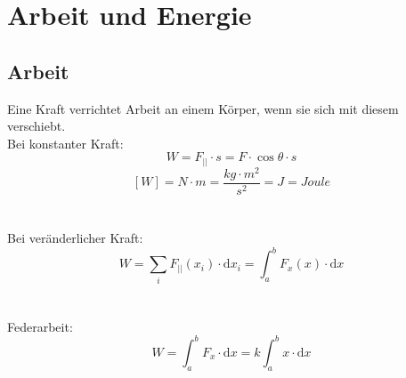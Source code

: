 



\chapter{Arbeit und Energie}
\section{Arbeit}
Eine Kraft verrichtet Arbeit an einem K\"orper, wenn sie sich mit diesem verschiebt.\\
\newline
Bei konstanter Kraft:
\[
	\boxed{W=F_{||}\cdot s=F\cdot\cos\theta\cdot s}
\]
\[
	[W]=N\cdot m=\frac{kg\cdot m^2}{s^2}=J=Joule
\]
\\
\\
Bei ver\"anderlicher Kraft:
\[
	\boxed{W=\sum_{i}{F_{||}(x_i)\cdot\mathrm{d}x_i}=\int_a^bF_x(x)\cdot\mathrm{d}x}
\]
\\
\\
Federarbeit:
\[
	\boxed{W=\int_a^bF_x\cdot\mathrm{d}x=k\int_a^bx\cdot\mathrm{d}x}
\]
